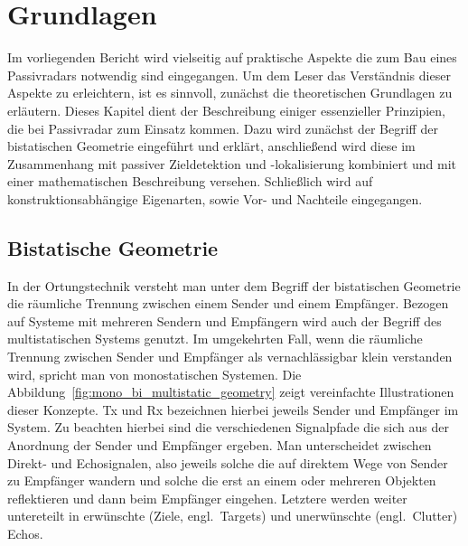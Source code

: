 \chapter{Grundlagen}

Im vorliegenden Bericht wird vielseitig auf praktische Aspekte die zum Bau eines Passivradars notwendig sind eingegangen. Um dem Leser das Verständnis dieser Aspekte zu erleichtern, ist es sinnvoll, zunächst die theoretischen Grundlagen zu erläutern. Dieses Kapitel dient der Beschreibung einiger essenzieller Prinzipien, die bei Passivradar zum Einsatz kommen. Dazu wird zunächst der Begriff der bistatischen Geometrie eingeführt und erklärt, anschließend wird diese im Zusammenhang mit passiver Zieldetektion und -lokalisierung kombiniert und mit einer mathematischen Beschreibung versehen. Schließlich wird auf konstruktionsabhängige Eigenarten, sowie Vor- und Nachteile eingegangen.

\section{Bistatische Geometrie}\label{sct:bistatic_geometry}

In der Ortungstechnik versteht man unter dem Begriff der bistatischen Geometrie die räumliche Trennung zwischen einem Sender und einem Empfänger. Bezogen auf Systeme mit mehreren Sendern und Empfängern wird auch der Begriff des multistatischen Systems genutzt. Im umgekehrten Fall, wenn die räumliche Trennung zwischen Sender und Empfänger als vernachlässigbar klein verstanden wird, spricht man von monostatischen Systemen. Die Abbildung~\ref{fig:mono_bi_multistatic_geometry} zeigt vereinfachte Illustrationen dieser Konzepte. Tx und Rx bezeichnen hierbei jeweils Sender und Empfänger im System. Zu beachten hierbei sind die verschiedenen Signalpfade die sich aus der Anordnung der Sender und Empfänger ergeben. Man unterscheidet zwischen Direkt- und Echosignalen, also jeweils solche die auf direktem Wege von Sender zu Empfänger wandern und solche die erst an einem oder mehreren Objekten reflektieren und dann beim Empfänger eingehen. Letztere werden weiter untereteilt in erwünschte (Ziele, engl.\ Targets) und unerwünschte (engl.\ Clutter) Echos.

